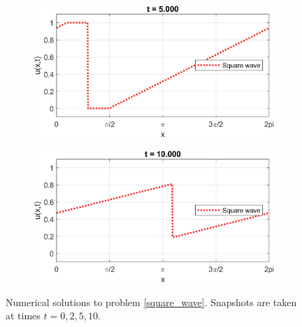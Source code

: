 \documentclass{myproject}
\begin{document}
\begin{figure}[h]
    \begin{subfigure}[b]{0.40\textwidth}
       \includegraphics[width=1\linewidth]{square_wave_5.png}
       \caption{}
    \end{subfigure}\qquad
    \begin{subfigure}[b]{0.40\textwidth}
       \includegraphics[width=1\linewidth]{square_wave_10.png}
       \caption{}
    \end{subfigure}
    \caption{Numerical solutions to problem \eqref{square_wave}. Snapshots are taken at times $t = 0, 2, 5, 10$.}
\end{figure}
\end{document}
